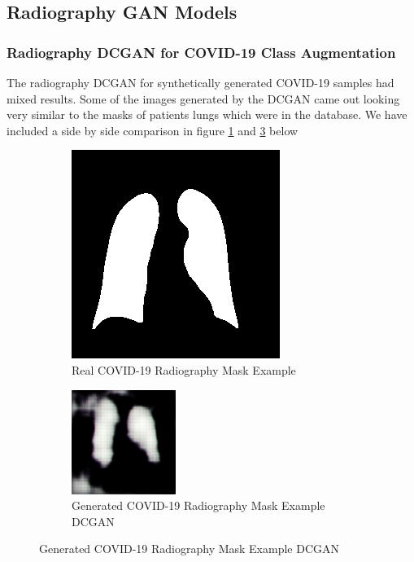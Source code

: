 \subsection{Radiography GAN Models}
\subsubsection{Radiography DCGAN for COVID-19 Class Augmentation}
The radiography DCGAN for synthetically generated COVID-19 samples had mixed results.  Some of the images generated by the DCGAN came out looking very similar to the masks of patients lungs which were in the database.  We have included a side by side comparison in figure \ref{fig:Real COVID-19 Radiography Mask Example} and \ref{fig:Synthetically Generated COVID-19 Radiography Mask(DCGAN)} below
 \begin{figure}[H]
    \centering
    \begin{subfigure}{.4\textwidth}
    \centering
      \includegraphics[width=.4\linewidth,keepaspectratio]{Images/Radiography_Real_Mask_COVID19_Example.png}
      \caption{Real COVID-19 Radiography Mask Example}
      \label{fig:Real COVID-19 Radiography Mask Example}
    \end{subfigure}\hfill%
    \begin{subfigure}{.4\textwidth}
    \centering
      \includegraphics[width=.4\linewidth,keepaspectratio]{Images/Radiography_GAN_Mask_COVID19_Example.png}
      \caption{Generated COVID-19 Radiography Mask Example DCGAN}
      \label{fig:Synthetically Generated COVID-19 Radiography Mask(DCGAN)}
    \end{subfigure}\hfill%
\end{figure}
